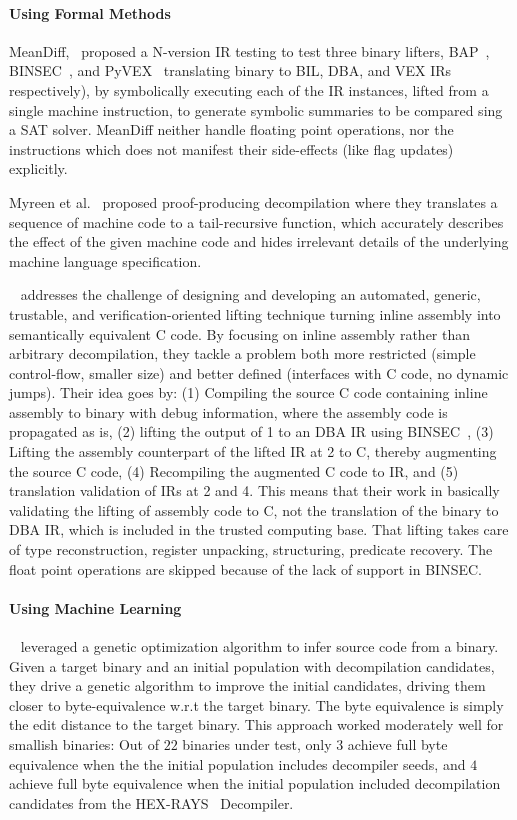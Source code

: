 \paragraph{Using Formal Methods}
MeanDiff,~\cite{ASE2017} proposed a N-version IR testing to test three binary lifters, BAP~\cite{BAP:CAV11}, BINSEC~\cite{BINSEC2011}, and PyVEX~\cite{PYVEX} translating binary to BIL, DBA, and VEX IRs respectively), by symbolically executing each of the IR instances, lifted from a single machine instruction, to generate symbolic summaries to be compared sing a SAT solver. MeanDiff neither handle floating point operations, nor the instructions which does not manifest their side-effects (like flag updates) explicitly.

Myreen et al.~\cite{Myreen:FMCAD:2008,Myreen:FMCAD:2012} proposed proof-producing decompilation where they translates a sequence of machine code to a tail-recursive function, which accurately describes the effect of the given machine code and hides irrelevant details of the underlying machine language specification.

~\cite{inlineassm} addresses the challenge of designing and developing an automated, generic, trustable, and verification-oriented lifting technique turning inline assembly into semantically equivalent C code. By focusing on inline assembly rather than arbitrary decompilation, they tackle a problem both more restricted (simple control-flow, smaller size) and better defined (interfaces with C code, no dynamic jumps). Their idea goes by: (1) Compiling the source C code containing inline assembly to binary with debug information, where the assembly code is propagated as is, (2) lifting the output of 1 to an DBA IR using BINSEC~\cite{BINSEC2011}, (3) Lifting the assembly counterpart of the lifted IR at 2 to C, thereby augmenting the  source C code, (4) Recompiling the augmented C code to IR, and (5) translation validation of IRs at 2 and 4. This means that their work in basically validating the lifting of assembly code to C, not the translation of the binary to DBA IR, which is included in the trusted computing base. That lifting takes care of type reconstruction, register unpacking, structuring, predicate recovery. The float point operations are skipped because of the lack of support in BINSEC.   

\paragraph{Using Machine Learning}
~\cite{eschulte2018bed} leveraged a genetic optimization algorithm to infer source code from a binary. Given a target binary and an initial population with decompilation candidates, they  drive a genetic algorithm to improve the initial candidates, driving them closer to byte-equivalence w.r.t the target binary. The byte equivalence  is simply the edit distance to the target binary. This approach worked moderately well for smallish binaries: Out of $22$ binaries under test, only $3$ achieve full byte equivalence when the the initial population includes decompiler seeds, and $4$ achieve full byte equivalence when the initial population included decompilation candidates  from the HEX-RAYS~\cite{hexray} Decompiler. 

